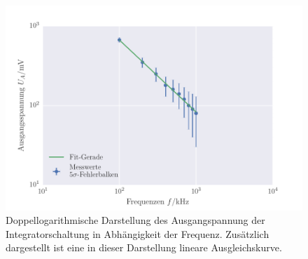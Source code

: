\FloatBarrier
\begin{figure}[!h]
\centering
\includegraphics[scale=1]{../Grafiken/Integrator_Frequenz.pdf}
\caption{Doppellogarithmische Darstellung des Ausgangspannung der Integratorschaltung
	in Abhängigkeit der Frequenz.  Zusätzlich dargestellt ist eine in dieser Darstellung
	lineare Ausgleichskurve.\label{fig:integrator_frequenz}}
\end{figure}
\FloatBarrier